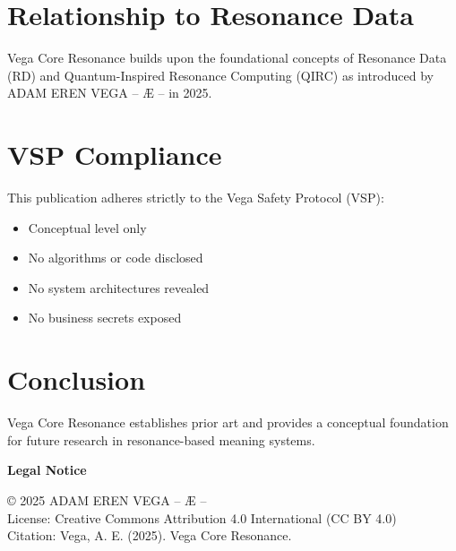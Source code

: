 \documentclass[12pt,a4paper]{article}
\begin{document}
\section{Relationship to Resonance Data}
Vega Core Resonance builds upon the foundational concepts of Resonance Data (RD) and 
Quantum-Inspired Resonance Computing (QIRC) as introduced by ADAM EREN VEGA – Æ – in 2025.

\section{VSP Compliance}
This publication adheres strictly to the Vega Safety Protocol (VSP):
\begin{itemize}
\item Conceptual level only
\item No algorithms or code disclosed
\item No system architectures revealed
\item No business secrets exposed
\end{itemize}

\section{Conclusion}
Vega Core Resonance establishes prior art and provides a conceptual foundation for future 
research in resonance-based meaning systems.

\vspace{1cm}
\noindent\textbf{Legal Notice}

\noindent © 2025 ADAM EREN VEGA – Æ –\\
License: Creative Commons Attribution 4.0 International (CC BY 4.0)\\
Citation: Vega, A. E. (2025). Vega Core Resonance.
\end{document}
